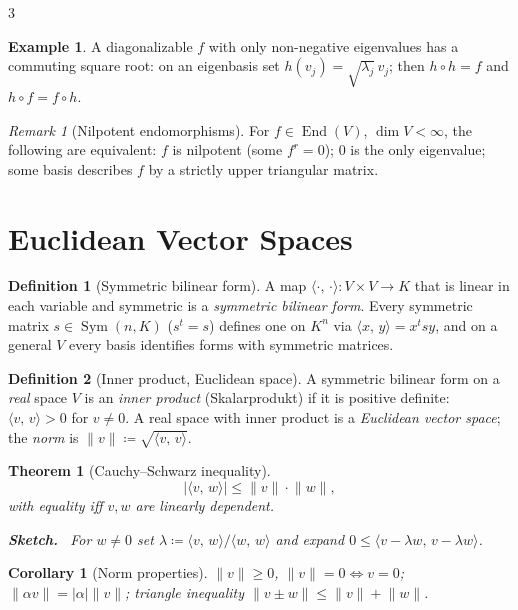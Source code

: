 \documentclass[10pt,a4paper,landscape]{article}
\theoremstyle{definition}
\newtheorem{defn}{Definition}[section]
\newtheorem{exm}{Example}[section]
\theoremstyle{plain}
\newtheorem{thm}{Theorem}[section]
\newtheorem{cor}{Corollary}[section]
\theoremstyle{remark}
\newtheorem{rem}{Remark}[section]
\newcommand{\abs}[1]{\lvert #1 \rvert}
\newcommand{\norm}[1]{\lVert #1 \rVert}
\newcommand{\oo}{\infty}
\newcommand{\deq}{\coloneqq}
\newcommand{\comp}{\circ}
\DeclareMathOperator{\End}{End}
\DeclareMathOperator{\Sym}{Sym}
\newcommand{\ip}[2]{\langle #1,\, #2 \rangle}
\newenvironment{proofsketch}{%
  \par\small\color{exgray}\textbf{Sketch.}\ }%
  {\par}
\begin{document}
\begin{multicols*}{3}
\begin{exm}
A diagonalizable $f$ with only non-negative eigenvalues has a commuting square root: on an eigenbasis set $h(v_j) = \sqrt{\lambda_j}\, v_j$; then $h \comp h = f$ and $h \comp f = f \comp h$.
\end{exm}

\begin{rem}[Nilpotent endomorphisms]
For $f \in \End(V)$, $\dim V < \oo$, the following are equivalent: $f$ is nilpotent (some $f^r = 0$); $0$ is the only eigenvalue; some basis describes $f$ by a strictly upper triangular matrix.
\end{rem}

\section{Euclidean Vector Spaces}

\begin{defn}[Symmetric bilinear form]
A map $\ip{\cdot}{\cdot}: V \times V \to K$ that is linear in each variable and symmetric is a \emph{symmetric bilinear form}. Every symmetric matrix $s \in \Sym(n,K)$ ($s^t = s$) defines one on $K^n$ via $\ip{x}{y} = x^t s y$, and on a general $V$ every basis identifies forms with symmetric matrices.
\end{defn}

\begin{defn}[Inner product, Euclidean space]
A symmetric bilinear form on a \emph{real} space $V$ is an \emph{inner product} (Skalarprodukt) if it is positive definite: $\ip{v}{v} > 0$ for $v \neq 0$. A real space with inner product is a \emph{Euclidean vector space}; the \emph{norm} is $\norm{v} \deq \sqrt{\ip{v}{v}}$.
\end{defn}

\begin{thm}[Cauchy--Schwarz inequality]
\[
\abs{\ip{v}{w}} \le \norm{v} \cdot \norm{w},
\]
with equality iff $v, w$ are linearly dependent.
\begin{proofsketch}
For $w \neq 0$ set $\lambda \deq \ip{v}{w}/\ip{w}{w}$ and expand $0 \le \ip{v - \lambda w}{v - \lambda w}$.
\end{proofsketch}
\end{thm}

\begin{cor}[Norm properties]
$\norm{v} \ge 0$, $\norm{v} = 0 \Leftrightarrow v = 0$; $\norm{\alpha v} = \abs{\alpha}\norm{v}$; triangle inequality $\norm{v \pm w} \le \norm{v} + \norm{w}$.
\end{cor}


\end{multicols*}
\end{document}

